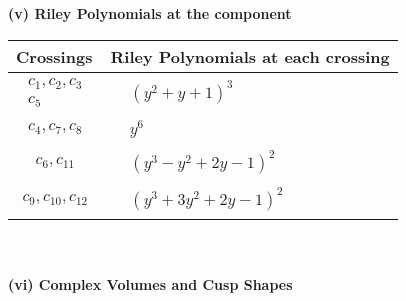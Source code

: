 \documentclass[1p]{elsarticle_modified}
\theoremstyle{definition}
\begin{document}
\newpage\renewcommand{\arraystretch}{1}
\flushleft \textbf{(v) Riley Polynomials at the component}\newline \\
\begin{tabular}{m{50pt}|m{274pt}}
Crossings & \hspace{64pt}Riley Polynomials at each crossing \\
\hline $$\begin{aligned}c_{1},c_{2},c_{3}\\c_{5}\end{aligned}$$&$\begin{aligned}
&(y^2+y+1)^3
\end{aligned}$\\
\hline $$\begin{aligned}c_{4},c_{7},c_{8}\end{aligned}$$&$\begin{aligned}
&y^6
\end{aligned}$\\
\hline $$\begin{aligned}c_{6},c_{11}\end{aligned}$$&$\begin{aligned}
&(y^3- y^2+2 y-1)^2
\end{aligned}$\\
\hline $$\begin{aligned}c_{9},c_{10},c_{12}\end{aligned}$$&$\begin{aligned}
&(y^3+3 y^2+2 y-1)^2
\end{aligned}$\\
\hline
\end{tabular}\\~\\
\newpage\flushleft \textbf{(vi) Complex Volumes and Cusp Shapes}
\end{document}
